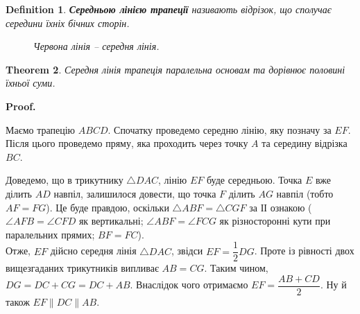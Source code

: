 \documentclass[a4paper, 10pt]{article}
\makeatletter
\def\qed{$\blacksquare$}
\theoremstyle{theoremdd}
\newtheorem{theorem}{Theorem}[subsection]
\theoremstyle{theoremdd}
\theoremstyle{theoremdd}
\newtheorem{definition}[theorem]{Definition}
\theoremstyle{theoremdd}
\theoremstyle{theoremdd}
\theoremstyle{theoremdd}
\theoremstyle{theoremdd}
\theoremstyle{theoremdd}
\theoremstyle{theoremdd}
\renewenvironment{proof}[1][Proof.\\]{\par
\pushQED{\hfill \qed}%
\normalfont \topsep6\p@\@plus6\p@\relax
\trivlist
\item\relax
{\bfseries
#1\@addpunct{.}}\hspace\labelsep\ignorespaces
}{%
\popQED\endtrivlist\@endpefalse
}
\makeatother
\begin{document}
\begin{definition}
\textbf{Середньою лінією трапеції} називають відрізок, що сполучає середини їхніх бічних сторін.
\begin{figure}[H]
\centering
{}
\caption*{Червона лінія -- середня лінія.}
\end{figure}
\end{definition}

\begin{theorem}
Середня лінія трапеція паралельна основам та дорівнює половині їхньої суми.
\end{theorem}

\begin{proof}
Маємо трапецію $ABCD$. Спочатку проведемо середню лінію, яку позначу за $EF$. Після цього проведемо пряму, яка проходить через точку $A$ та середину відрізка $BC$.
\begin{figure}[H]
\centering
{}
\end{figure}
Доведемо, що в трикутнику $\triangle DAC$, лінію $EF$ буде середньою. Точка $E$ вже ділить $AD$ навпіл, залишилося довести, що точка $F$ ділить $AG$ навпіл (тобто $AF = FG$). Це буде правдою, оскільки $\triangle ABF = \triangle CGF$ за ІІ ознакою ($\angle AFB = \angle CFD$ як вертикальні; $\angle ABF = \angle FCG$ як різносторонні кути при паралельних прямих; $BF = FC$).\\
Отже, $EF$ дійсно середня лінія $\triangle DAC$, звідси $EF = \dfrac{1}{2}DG$. Проте із рівності двох вищезгаданих трикутників випливає $AB = CG$. Таким чином, $DG = DC + CG = DC + AB$. Внаслідок чого отримаємо $EF = \dfrac{AB + CD}{2}$. Ну й також $EF \parallel DC \parallel AB$.
\end{proof}
\end{document}
